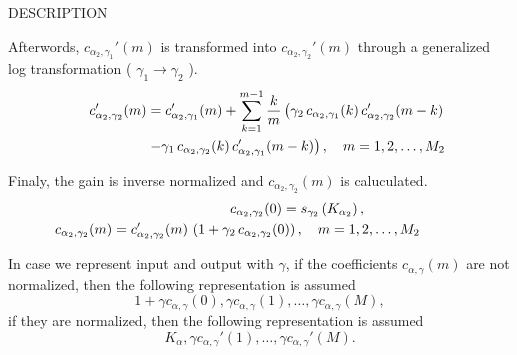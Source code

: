 \begin{qsection}{DESCRIPTION}
\par
Afterwords, $c_{\alpha_2,\gamma_1}'(m)$ is transformed into 
$c_{\alpha_2,\gamma_2}'(m)$ through a generalized log transformation
( $\gamma_1 \rightarrow \gamma_2$ ).%
\begin{eqnarray*}
\hspace{-15mm}&&c_{\alpha_2,\gamma_2}'(m) =
        c_{\alpha_2,\gamma_1}'(m)+\sum_{k=1}^{m-1} \frac{k}{m}
          \left( \gamma_2\,c_{\alpha_2,\gamma_1}(k)\,
	  c_{\alpha_2,\gamma_2}'(m-k) \right. \nonumber \\
\hspace{-15mm}&& \hspace{30mm} \left. -\gamma_1\,c_{\alpha_2,\gamma_2}(k)\,
          c_{\alpha_2,\gamma_1}'(m-k) \right), 
	  \quad m = 1, 2, \ldots, M_2 
\end{eqnarray*}

\par
Finaly, the gain is inverse normalized and $c_{\alpha_2,\gamma_2}(m)$
is caluculated.
\begin{eqnarray*}
\hspace{-15mm}&&c_{\alpha_2,\gamma_2}(0)= 
	s_{\gamma_2}\left(K_{\alpha_2}\right), \qquad \qquad \\
\hspace{-15mm}&&c_{\alpha_2,\gamma_2}(m) =
          c_{\alpha_2,\gamma_2}'(m)\,\left(1+\gamma_2\, 
          c_{\alpha_2,\gamma_2}(0)\right), 
          \quad m = 1,2,\ldots, M_2
\end{eqnarray*}

In case we represent input and output with $\gamma$,
if the coefficients $c_{\alpha,\gamma}(m)$ are not normalized, then
the following representation is assumed
\begin{displaymath}
1+\gamma c_{\alpha,\gamma}(0), \gamma c_{\alpha,\gamma}(1), \ldots, \gamma c_{\alpha,\gamma}(M),
\end{displaymath}
if they are normalized, then
the following representation is assumed
\begin{displaymath}
K_\alpha,\gamma c_{\alpha,\gamma}'(1),\ldots, \gamma c_{\alpha,\gamma}'(M).
\end{displaymath}

\end{qsection}

\begin{options}
\end{options}

